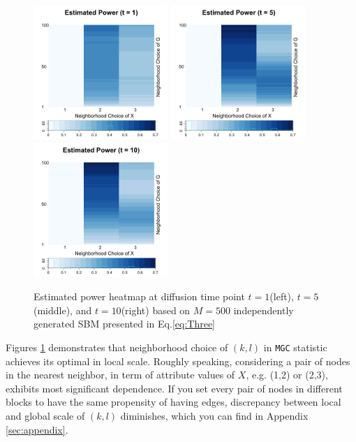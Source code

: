 \documentclass[12pt]{article}
\theoremstyle{definition}
\begin{document}
\begin{figure}[H]
	\centering
	\label{fig:ThreeSBM_power}
	\includegraphics[width=2in]{../Figure/ThreeSBM_power1.png}
	\includegraphics[width=2in]{../Figure/ThreeSBM_power5.png}
	\includegraphics[width=2in]{../Figure/ThreeSBM_power10.png}
	\caption{Estimated power heatmap at diffusion time point $t=1$(left), $t=5$(middle), and $t=10$(right) based on $M = 500$ independently generated SBM presented in Eq.\ref{eq:Three}}
\end{figure}


Figures \ref{fig:ThreeSBM_power} demonstrates that neighborhood choice of $(k,l)$ in \texttt{MGC} statistic achieves its optimal in local scale. Roughly speaking, considering a pair of nodes in the nearest neighbor, in term of attribute values of $X$, e.g. (1,2) or (2,3), exhibits most significant dependence. If you set every pair of nodes in different blocks to have the same propensity of having edges, discrepancy between local and global scale of $(k,l)$ diminishes, which you can find in Appendix \ref{sec:appendix}.
\end{document}

